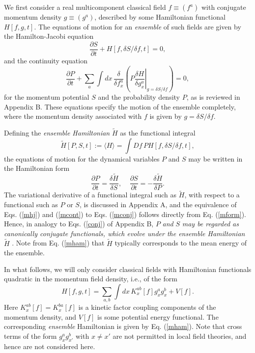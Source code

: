 \documentclass[a4paper,preprint, showpacs, aps, draft]{revtex4}
\begin{document}
{We first consider a real multicomponent classical field $f\equiv(f^a)$ 
with conjugate
momentum density $g\equiv(g^a)$, described by some Hamiltonian functional
$H[f,g,t]$.
The equations of motion for an {\it ensemble} of such fields are
given by the Hamilton-Jacobi equation
\begin{equation} \label{mhj}
\frac{\partial S}{\partial t} + H[f,\delta S/\delta f, t] = 0 ,
\end{equation}
and the continuity equation
\begin{equation} \label{mcont}
\frac{\partial P}{\partial t} + \sum_a\int dx\, \frac{\delta}{\delta
f^a_x}\left(P\left.\frac{\delta H}{\delta g^a_x}\right|_{g=\delta
S/\delta f}\right) = 0 ,
\end{equation}
for the momentum potential $S$ and the probability density $P$,
as is reviewed in Appendix B.  These equations specify the motion of
the ensemble completely, where the momentum density associated with $f$
is given by $g=\delta S/\delta f$.

Defining the {\it ensemble Hamiltonian} $\tilde{H}$
as the functional integral
\begin{equation} \label{mham}
\tilde{H}[P, S, t]:= \langle H\rangle = \int D\!f\, PH[f, \delta
S/\delta f, t] ,
\end{equation}
the equations of motion for the dynamical variables 
$P$ and $S$ may be written in the
Hamiltonian form
\begin{equation} \label{mconj}
\frac{\partial P}{\partial t} = \frac{\delta\tilde{H}}{\delta S}, ~~~~~
\frac{\partial S}{\partial t} = - \frac{\delta\tilde{H}}{\delta P} .
\end{equation}
The variational derivative of a functional integral such as $\tilde{H}$,
with respect to a functional such as $P$ or $S$, is
discussed in Appendix A, and
the equivalence of Eqs. (\ref{mhj})
and (\ref{mcont}) to Eqs. (\ref{mconj}) follows directly from Eq.
(\ref{mform}).
Hence, in analogy to Eqs. (\ref{conj})
of Appendix B, $P$ {\it and} $S$ {\it may be regarded as 
canonically conjugate functionals, 
which evolve under the ensemble Hamiltonian} $\tilde{H}$ \cite{footact}.  Note 
from Eq. (\ref{mham}) that $\tilde{H}$ typically corresponds to the mean
energy of the ensemble.   

In what follows, we will only consider classical fields with 
Hamiltonian functionals quadratic in the momentum field
density, i.e., of the form
\begin{equation} \label{hquad}
H[f, g, t] = \sum_{a,b}\int dx\, K^{ab}_{x}[f] g^a_xg^b_x + V[f] .
\end{equation}
Here $K^{ab}_x[f]=K^{ba}_x[f]$ is a kinetic factor coupling components
of the momentum density, and $V[f]$ is some potential energy functional. 
The corresponding
{\it ensemble} Hamiltonian is given by Eq. (\ref{mham}).  Note that cross terms
of the form $g^a_xg^b_{x'}$ with $x\neq x'$
are not permitted in local field theories, and
hence are not considered here. 

}
\end{document}
